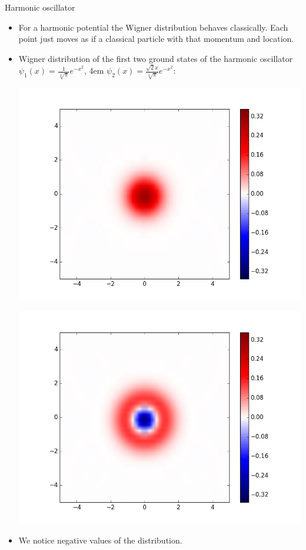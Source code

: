 \documentclass{beamer}
\begin{document}
\begin{frame}{Harmonic oscillator}
	\begin{itemize}
		\vfill
		\item For a harmonic potential the Wigner distribution behaves classically. Each point just moves as if a classical particle with that momentum and location.
		\vfill
		\item Wigner distribution of the first two ground states of the harmonic oscillator $\psi_1(x) = \frac{1}{\sqrt[4]\pi}e^{-x^2}$, \kern4em $\psi_2(x) = \frac{\sqrt{2}x}{\sqrt[4]\pi}e^{-x^2}$:
		\begin{minipage}[t][][b]{0.49\linewidth}
			\centering
			\vspace*{-5pt}
			\includegraphics[width=1\linewidth]{oscEigen0}
		\end{minipage}
		\begin{minipage}[t][][b]{0.49\linewidth}
			\centering
			\vspace*{-5pt}
			\includegraphics[width=1\linewidth]{oscEigen1}
		\end{minipage}
		\vfill
		\item We notice negative values of the distribution.
		\vfill
	\end{itemize}
\end{frame}
\end{document}
